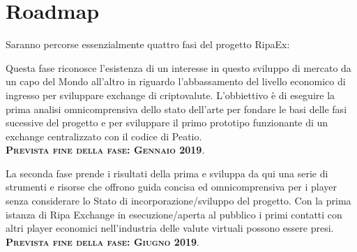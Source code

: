 \section{Roadmap}
Saranno percorse essenzialmente quattro fasi del progetto RipaEx:
\begin{center}
\begin{tcolorbox}[roadmapBox,
	title=\textbf{\textsc{Finanziamneto del progetto: XPX presale e RIPA TEC (WP2)}}]

	Questa fase riconosce l'esistenza di un interesse in questo sviluppo di mercato
	da un capo del Mondo all'altro in riguardo l'abbassamento del livello economico di ingresso
	per sviluppare exchange di criptovalute.
	L'obbiettivo è di eseguire la prima analisi omnicomprensiva dello stato dell'arte per fondare
	le basi delle fasi sucessive del progetto e per sviluppare il primo prototipo
	funzionante di un exchange centralizzato con il codice di Peatio.\\
	\vspace{1cm}
	\centering\textbf{\textsc{Prevista fine della fase: Gennaio 2019}}.
\end{tcolorbox}
\resizebox{0.05\textwidth}{26pt}{$\Downarrow$}
\begin{tcolorbox}[roadmapBox,
	title=\textbf{\textsc{Apertura del primo exchange e sviluppo di strumenti e risorse (WP3)}}]

	La seconda fase prende i risultati della prima e sviluppa da qui
	una serie di strumenti e risorse che offrono guida concisa ed omnicomprensiva per 
	i player senza considerare lo Stato di incorporazione/sviluppo del progetto. Con la prima
	istanza di Ripa Exchange in esecuzione/aperta al pubblico i primi contatti con altri player economici
	nell'industria delle valute virtuali possono essere presi.\\
	\vspace{1cm}
	\centering\textbf{\textsc{Prevista fine della fase: Giugno 2019}}.
\end{tcolorbox}
\resizebox{0.05\textwidth}{26pt}{$\Downarrow$}
\begin{tcolorbox}[roadmapBox,
	title=\textbf{\textsc{Esecuzione, diffusione (WP 7/8) e Coordinamento del Progetto (WP1)}}]


\end{tcolorbox}
\end{center}
